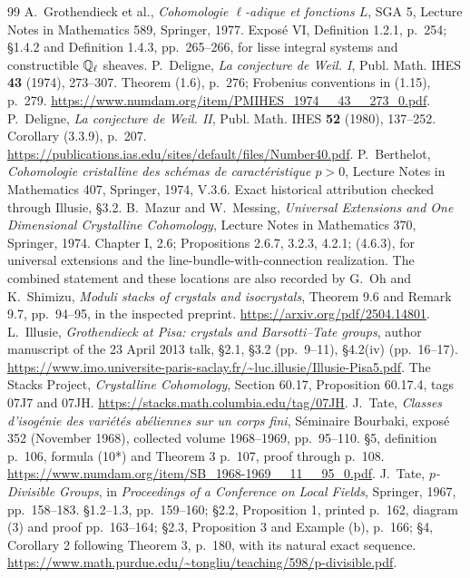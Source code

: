 \documentclass[11pt,a4paper]{article}
\theoremstyle{definition}\newtheorem{remark}[theorem]{Remark}
\begin{document}
\begin{thebibliography}{99}
 A.~Grothendieck et al., \emph{Cohomologie $\ell$-adique et fonctions $L$}, SGA 5, Lecture Notes in Mathematics 589, Springer, 1977. Expos\'e VI, Definition 1.2.1, p.~254; \S1.4.2 and Definition 1.4.3, pp.~265--266, for lisse integral systems and constructible $\mathbb Q_\ell$ sheaves.
 P.~Deligne, \emph{La conjecture de Weil. I}, Publ. Math. IHES \textbf{43} (1974), 273--307. Theorem (1.6), p.~276; Frobenius conventions in (1.15), p.~279. \url{https://www.numdam.org/item/PMIHES_1974__43__273_0.pdf}.
 P.~Deligne, \emph{La conjecture de Weil. II}, Publ. Math. IHES \textbf{52} (1980), 137--252. Corollary (3.3.9), p.~207. \url{https://publications.ias.edu/sites/default/files/Number40.pdf}.
 P.~Berthelot, \emph{Cohomologie cristalline des sch\'emas de caract\'eristique $p>0$}, Lecture Notes in Mathematics 407, Springer, 1974, V.3.6. Exact historical attribution checked through Illusie, \S3.2.
 B.~Mazur and W.~Messing, \emph{Universal Extensions and One Dimensional Crystalline Cohomology}, Lecture Notes in Mathematics 370, Springer, 1974. Chapter I, 2.6; Propositions 2.6.7, 3.2.3, 4.2.1; (4.6.3), for universal extensions and the line-bundle-with-connection realization. The combined statement and these locations are also recorded by G.~Oh and K.~Shimizu, \emph{Moduli stacks of crystals and isocrystals}, Theorem 9.6 and Remark 9.7, pp.~94--95, in the inspected preprint. \url{https://arxiv.org/pdf/2504.14801}.
 L.~Illusie, \emph{Grothendieck at Pisa: crystals and Barsotti--Tate groups}, author manuscript of the 23 April 2013 talk, \S2.1, \S3.2 (pp.~9--11), \S4.2(iv) (pp.~16--17). \url{https://www.imo.universite-paris-saclay.fr/~luc.illusie/Illusie-Pisa5.pdf}.
 The Stacks Project, \emph{Crystalline Cohomology}, Section 60.17, Proposition 60.17.4, tags 07J7 and 07JH. \url{https://stacks.math.columbia.edu/tag/07JH}.
 J.~Tate, \emph{Classes d'isog\'enie des vari\'et\'es ab\'eliennes sur un corps fini}, S\'eminaire Bourbaki, expos\'e 352 (November 1968), collected volume 1968--1969, pp.~95--110. \S5, definition p.~106, formula (10*) and Theorem 3 p.~107, proof through p.~108. \url{https://www.numdam.org/item/SB_1968-1969__11__95_0.pdf}.
 J.~Tate, \emph{$p$-Divisible Groups}, in \emph{Proceedings of a Conference on Local Fields}, Springer, 1967, pp.~158--183. \S1.2--1.3, pp.~159--160; \S2.2, Proposition 1, printed p.~162, diagram (3) and proof pp.~163--164; \S2.3, Proposition 3 and Example (b), p.~166; \S4, Corollary 2 following Theorem 3, p.~180, with its natural exact sequence. \url{https://www.math.purdue.edu/~tongliu/teaching/598/p-divisible.pdf}.

\end{thebibliography}
\end{document}
